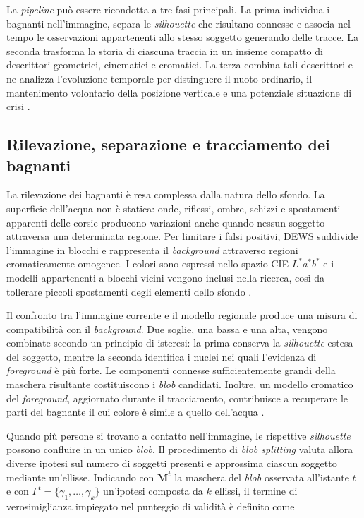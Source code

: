 La \textit{pipeline} può essere ricondotta a tre fasi principali. La prima individua i bagnanti nell'immagine, separa le \textit{silhouette} che risultano connesse e associa nel tempo le osservazioni appartenenti allo stesso soggetto generando delle tracce. La seconda trasforma la storia di ciascuna traccia in un insieme compatto di descrittori geometrici, cinematici e cromatici. La terza combina tali descrittori e ne analizza l'evoluzione temporale per distinguere il nuoto ordinario, il mantenimento volontario della posizione verticale e una potenziale situazione di crisi \cite{Eng2008DEWS}.

\subsection{Rilevazione, separazione e tracciamento dei bagnanti}

La rilevazione dei bagnanti è resa complessa dalla natura dello sfondo. La superficie dell'acqua non è statica: onde, riflessi, ombre, schizzi e spostamenti apparenti delle corsie producono variazioni anche quando nessun soggetto attraversa una determinata regione. Per limitare i falsi positivi, DEWS suddivide l'immagine in blocchi e rappresenta il \textit{background} attraverso regioni cromaticamente omogenee. I colori sono espressi nello spazio CIE $L^*a^*b^*$ e i modelli appartenenti a blocchi vicini vengono inclusi nella ricerca, così da tollerare piccoli spostamenti degli elementi dello sfondo \cite{Eng2004Region,Eng2006Robust}.

Il confronto tra l'immagine corrente e il modello regionale produce una misura di compatibilità con il \textit{background}. Due soglie, una bassa e una alta, vengono combinate secondo un principio di isteresi: la prima conserva la \textit{silhouette} estesa del soggetto, mentre la seconda identifica i nuclei nei quali l'evidenza di \textit{foreground} è più forte. Le componenti connesse sufficientemente grandi della maschera risultante costituiscono i \textit{blob} candidati. Inoltre, un modello cromatico del \textit{foreground}, aggiornato durante il tracciamento, contribuisce a recuperare le parti del bagnante il cui colore è simile a quello dell'acqua \cite{Eng2006Robust,Eng2008DEWS}.

Quando più persone si trovano a contatto nell'immagine, le rispettive \textit{silhouette} possono confluire in un unico \textit{blob}. Il procedimento di \textit{blob splitting} valuta allora diverse ipotesi sul numero di soggetti presenti e approssima ciascun soggetto mediante un'ellisse. Indicando con $\boldsymbol{M}^t$ la maschera del \textit{blob} osservata all'istante $t$ e con $\Gamma^t=\{\gamma_1,\ldots,\gamma_k\}$ un'ipotesi composta da $k$ ellissi, il termine di verosimiglianza impiegato nel punteggio di validità è definito come


